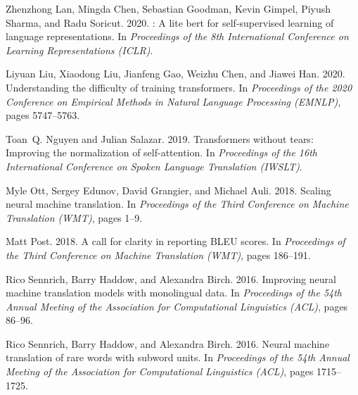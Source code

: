 \documentclass[11pt]{article}
\begin{document}
\begin{thebibliography}{16}
Zhenzhong Lan, Mingda Chen, Sebastian Goodman, Kevin Gimpel, Piyush Sharma, and
  Radu Soricut. 2020.
: A lite bert for self-supervised learning of language
  representations.
\newblock In \emph{Proceedings of the 8th International Conference on Learning
  Representations (ICLR)}.

Liyuan Liu, Xiaodong Liu, Jianfeng Gao, Weizhu Chen, and Jiawei Han. 2020.
\newblock Understanding the difficulty of training transformers.
\newblock In \emph{Proceedings of the 2020 Conference on Empirical Methods in
  Natural Language Processing (EMNLP)}, pages 5747--5763.

Toan~Q. Nguyen and Julian Salazar. 2019.
\newblock Transformers without tears: Improving the normalization of
  self-attention.
\newblock In \emph{Proceedings of the 16th International Conference on Spoken
  Language Translation (IWSLT)}.

Myle Ott, Sergey Edunov, David Grangier, and Michael Auli. 2018.
\newblock Scaling neural machine translation.
\newblock In \emph{Proceedings of the Third Conference on Machine Translation
  (WMT)}, pages 1--9.

Matt Post. 2018.
\newblock A call for clarity in reporting {BLEU} scores.
\newblock In \emph{Proceedings of the Third Conference on Machine Translation
  (WMT)}, pages 186--191.

Rico Sennrich, Barry Haddow, and Alexandra Birch. 2016{}.
\newblock Improving neural machine translation models with monolingual data.
\newblock In \emph{Proceedings of the 54th Annual Meeting of the Association
  for Computational Linguistics (ACL)}, pages 86--96.

Rico Sennrich, Barry Haddow, and Alexandra Birch. 2016{}.
\newblock Neural machine translation of rare words with subword units.
\newblock In \emph{Proceedings of the 54th Annual Meeting of the Association
  for Computational Linguistics (ACL)}, pages 1715--1725.


\end{thebibliography}
\end{document}
